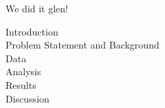 \documentclass[a4paper]{article}
\begin{document}
\begin{center}
{\Huge We did it glen!}
\end{center}

{\LARGE Introduction}\\


{\LARGE Problem Statement and Background}\\


{\LARGE Data}\\


{\LARGE Analysis}\\


{\LARGE Results}\\


{\LARGE Discussion}\\
\end{document}
